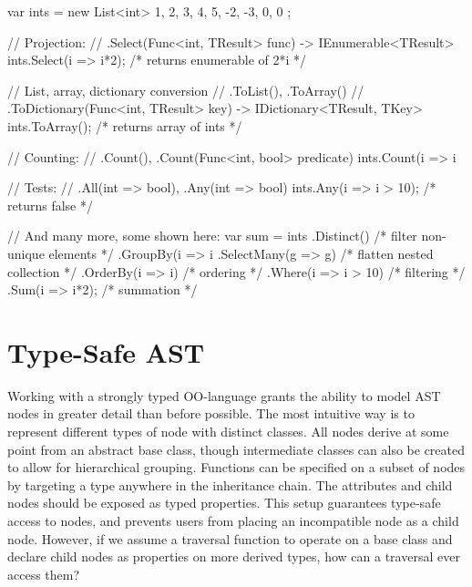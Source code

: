\documentclass[twoside,openright]{uva-bachelor-thesis}
\begin{document}
			\begin{codespan}
				\begin{csharpcode}
					var ints = new List<int> { 1, 2, 3, 4, 5, -2, -3, 0, 0 };
					
					// Projection:
					//   .Select(Func<int, TResult> func) -> IEnumerable<TResult>
					ints.Select(i => i*2);          /* returns enumerable of 2*i */
					
					// List, array, dictionary conversion
					//   .ToList(), .ToArray()
					//   .ToDictionary(Func<int, TResult> key) -> IDictionary<TResult, TKey>
					ints.ToArray();                 /* returns array of ints */
					
					// Counting:
					//   .Count(), .Count(Func<int, bool> predicate)
					ints.Count(i => i %
					
					// Tests:
					//   .All(int => bool), .Any(int => bool)
					ints.Any(i => i > 10);          /* returns false */
					
					// And many more, some shown here:
					var sum = ints
						.Distinct()          /* filter non-unique elements */
						.GroupBy(i => i%
						.SelectMany(g => g)  /* flatten nested collection */
						.OrderBy(i => i)     /* ordering */
						.Where(i => i > 10)  /* filtering */
						.Sum(i => i*2);      /* summation */
				\end{csharpcode}
			\end{codespan}
	
	

		
	
	\section{Type-Safe AST}
	\label{type-safe-ast}
		Working with a strongly typed OO-language grants the ability to model AST nodes in greater detail than before possible. The most intuitive way is to represent different types of node with distinct classes. All nodes derive at some point from an abstract base class, though intermediate classes can also be created to allow for hierarchical grouping. Functions can be specified on a subset of nodes by targeting a type anywhere in the inheritance chain. The attributes and child nodes should be exposed as typed properties. This setup guarantees type-safe access to nodes, and prevents users from placing an incompatible node as a child node. However, if we assume a traversal function to operate on a base class and declare child nodes as properties on more derived types, how can a traversal ever access them?
		
\end{document}
